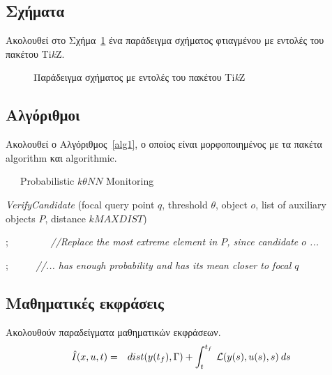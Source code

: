 \subsection{Σχήματα}
Ακολουθεί στο Σχήμα~\ref{fig2} ένα παράδειγμα σχήματος φτιαγμένου με εντολές του πακέτου Ti\textit{k}Z.
\begin{figure}[htb]
\begin{center}
\end{center}
\caption{Παράδειγμα σχήματος με εντολές του πακέτου Ti\textit{k}Z}	
\label{fig2}
\end{figure}

\subsection{Αλγόριθμοι}
Ακολουθεί ο Αλγόριθμος~\ref{alg1}, ο οποίος είναι μορφοποιημένος με τα πακέτα algorithm και algorithmic.

\begin{algorithm}[htb]
\caption{\ \ \ Probabilistic $k\theta NN$ Monitoring}
\begin{algorithmic}[1]
\begin{small}

 {\em VerifyCandidate} (focal query point $q$, threshold $\theta$, object $o$, list of auxiliary objects $P$, distance $kMAXDIST$) 


;   \ \ \ \ \ \ \ \ {\em //Replace the most extreme element in $P$, since candidate $o$ ... }

;  \ \ \ \ \ {\em //... has enough probability and has its mean closer to focal $q$ }

\ENDIF



\end{small}
\end{algorithmic}
\label{alg1}
\end{algorithm}

\subsection{Μαθηματικές εκφράσεις}
Ακολουθούν παραδείγματα μαθηματικών εκφράσεων.
\begin{eqnarray}
\hat{I}(x,u,t)     &=& dist(y(t_f),\Gamma)
+  \int_t^{t_f} \: {\cal L}( y(s),u(s),s) \: ds
\label{con11b}
\end{eqnarray}

